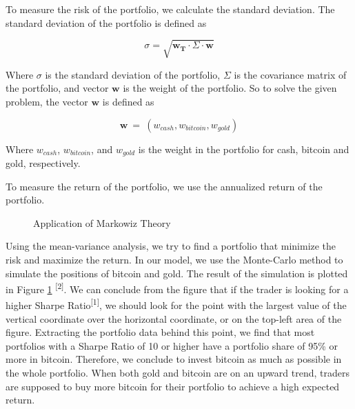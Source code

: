 \documentclass[12pt,a4paper]{article}
\begin{document}
\begin{spacing}{1.2}
To measure the risk of the portfolio, we calculate the standard deviation. The standard deviation of the portfolio is defined as

$$
	\sigma = \sqrt{\mathbf{w_T}  \cdot \Sigma \cdot \mathbf{w}}
$$

Where $\sigma$ is the standard deviation of the portfolio, $\Sigma$ is the covariance matrix of the portfolio, and vector $\mathbf{w}$ is the weight of the portfolio. So to solve the given problem, the vector $\mathbf{w}$ is defined as 

$$
\mathbf{w} \ = \ (w_{cash},w_{bitcoin},w_{gold})
$$

Where $w_{cash}$, $w_{bitcoin}$, and $w_{gold}$ is the weight in the portfolio for cash, bitcoin and gold, respectively. 

To measure the return of the portfolio, we use the annualized return of the portfolio.

\begin{figure}[H]
	\caption{Application of Markowiz Theory}
	\label{figure:markowiz}
\end{figure}

Using the mean-variance analysis, we try to find a portfolio that minimize the risk and maximize the return. In our model, we use the Monte-Carlo method to simulate the positions of bitcoin and gold. The result of the simulation is plotted in Figure \ref{figure:markowiz} \textsuperscript{[2]}.
We can conclude from the figure that if the trader is looking for a higher Sharpe Ratio\textsuperscript{[1]}, we should look for the point with the largest value of the vertical coordinate over the horizontal coordinate, or on the top-left area of the figure.
Extracting the portfolio data behind this point, we find that most portfolios with a Sharpe Ratio of 10 or higher have a portfolio share of 95\% or more in bitcoin.
Therefore, we conclude to invest bitcoin as much as possible in the whole portfolio. When both gold and bitcoin are on an upward trend, traders are supposed to buy more bitcoin for their portfolio to achieve a high expected return.



\end{spacing}
\end{document}
